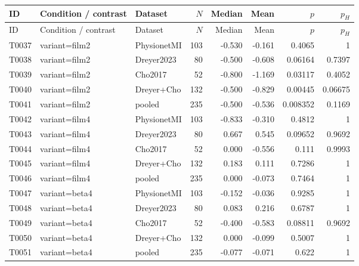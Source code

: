 \begin{longtable}{p{.45in}p{2.6in}p{.75in}rrrrr}
\toprule
ID & Condition / contrast & Dataset & $N$ & Median & Mean & $p$ & $p_H$ \\
\midrule
\endfirsthead
\toprule
ID & Condition / contrast & Dataset & $N$ & Median & Mean & $p$ & $p_H$ \\
\midrule
\endhead
T0037 & variant=film2 & PhysionetMI & 103 & -0.530 & -0.161 & 0.4065 & 1 \\
T0038 & variant=film2 & Dreyer2023 & 80 & -0.500 & -0.608 & 0.06164 & 0.7397 \\
T0039 & variant=film2 & Cho2017 & 52 & -0.800 & -1.169 & 0.03117 & 0.4052 \\
T0040 & variant=film2 & Dreyer+Cho & 132 & -0.500 & -0.829 & 0.00445 & 0.06675 \\
T0041 & variant=film2 & pooled & 235 & -0.500 & -0.536 & 0.008352 & 0.1169 \\
T0042 & variant=film4 & PhysionetMI & 103 & -0.833 & -0.310 & 0.4812 & 1 \\
T0043 & variant=film4 & Dreyer2023 & 80 & 0.667 & 0.545 & 0.09652 & 0.9692 \\
T0044 & variant=film4 & Cho2017 & 52 & 0.000 & -0.556 & 0.111 & 0.9993 \\
T0045 & variant=film4 & Dreyer+Cho & 132 & 0.183 & 0.111 & 0.7286 & 1 \\
T0046 & variant=film4 & pooled & 235 & 0.000 & -0.073 & 0.7464 & 1 \\
T0047 & variant=beta4 & PhysionetMI & 103 & -0.152 & -0.036 & 0.9285 & 1 \\
T0048 & variant=beta4 & Dreyer2023 & 80 & 0.083 & 0.216 & 0.6787 & 1 \\
T0049 & variant=beta4 & Cho2017 & 52 & -0.400 & -0.583 & 0.08811 & 0.9692 \\
T0050 & variant=beta4 & Dreyer+Cho & 132 & 0.000 & -0.099 & 0.5007 & 1 \\
T0051 & variant=beta4 & pooled & 235 & -0.077 & -0.071 & 0.622 & 1 \\
\bottomrule
\end{longtable}
